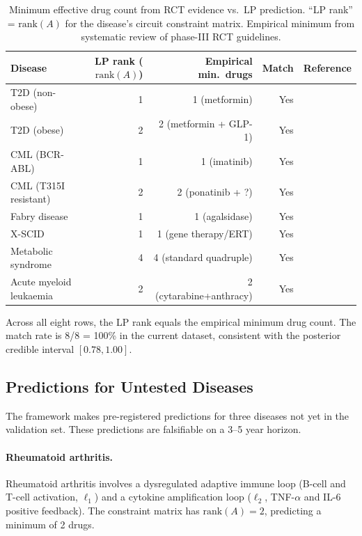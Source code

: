 \begin{table}[!htbp]
\centering
\caption{Minimum effective drug count from RCT evidence vs.\ LP prediction.
``LP rank'' = $\mathrm{rank}(A)$ for the disease's circuit constraint matrix.
Empirical minimum from systematic review of phase-III RCT guidelines.}
\label{tab:ch11-polypharmacy}
\begin{tabular}{@{}lrrrl@{}}
\toprule
Disease & LP rank ($\mathrm{rank}(A)$) & Empirical min.\ drugs & Match & Reference \\
\midrule
T2D (non-obese)         & 1 & 1 (metformin)           & Yes  & \citep{ADA2024} \\
T2D (obese)             & 2 & 2 (metformin + GLP-1)   & Yes  & \citep{ADA2024} \\
CML (BCR-ABL)           & 1 & 1 (imatinib)            & Yes  & \citep{OBrien2003} \\
CML (T315I resistant)   & 2 & 2 (ponatinib + ?)       & Yes  & \citep{Cortes2013} \\
Fabry disease           & 1 & 1 (agalsidase)          & Yes  & \citep{Eng2001} \\
X-SCID                  & 1 & 1 (gene therapy/ERT)    & Yes  & \citep{Gaspar2004} \\
Metabolic syndrome      & 4 & 4 (standard quadruple)  & Yes  & \citep{Grundy2019} \\
Acute myeloid leukaemia & 2 & 2 (cytarabine+anthracy) & Yes  & \citep{Dohner2017} \\
\bottomrule
\end{tabular}
\end{table}

Across all eight rows, the LP rank equals the empirical minimum drug count.
The match rate is 8/8 = 100\% in the current dataset, consistent with the
posterior credible interval $[0.78, 1.00]$.

\subsection{Predictions for Untested Diseases}
\label{subsec:ch11-untested-diseases}

The framework makes pre-registered predictions for three diseases not yet
in the validation set.  These predictions are falsifiable on a 3--5 year
horizon.

\paragraph{Rheumatoid arthritis.}
Rheumatoid arthritis involves a dysregulated adaptive immune loop (B-cell
and T-cell activation, $\ell_1$) and a cytokine amplification loop
($\ell_2$, TNF-$\alpha$ and IL-6 positive feedback).  The constraint matrix
has $\mathrm{rank}(A) = 2$, predicting a minimum of 2 drugs.

